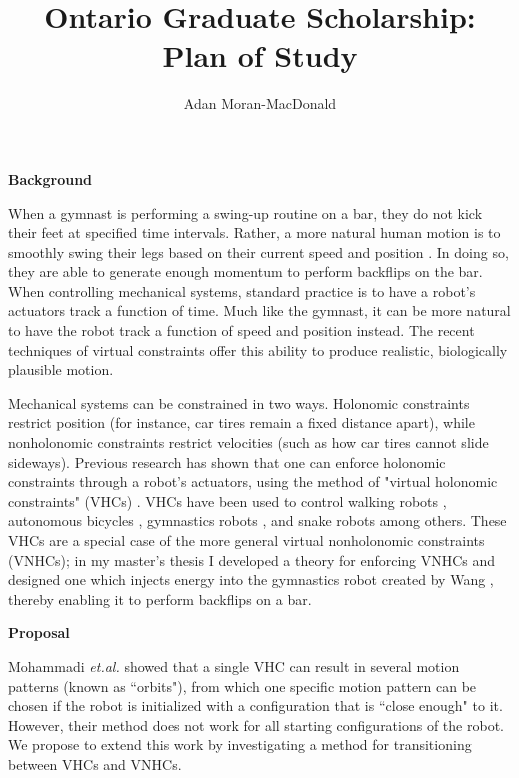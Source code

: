 \documentclass[a4paper,12pt]{article}
\begin{document}
\title{Ontario Graduate Scholarship: Plan of Study}
\author{Adan Moran-MacDonald}
\date{}
\maketitle

\begin{large}
\textbf{Background}
\end{large}

When a gymnast is performing a swing-up routine on a bar, they do not kick their
feet at specified time intervals. Rather, a more natural human motion is to
smoothly swing their legs based on their current speed and position
\cite{pendulum_length_giant_gymnastics}. In doing so, they are able to generate
enough momentum to perform backflips on the bar. When controlling mechanical
systems, standard practice is to have a robot's actuators track a function of
time. Much like the gymnast, it can be more natural to have the robot track a
function of speed and position instead. The recent techniques of virtual
constraints offer this ability to produce realistic, biologically plausible
motion.

Mechanical systems can be constrained in two ways. Holonomic constraints
restrict position (for instance, car tires remain a fixed distance apart), while
nonholonomic constraints restrict velocities (such as how car tires cannot
slide sideways). Previous research has shown that one can enforce holonomic
constraints through a robot's actuators, using the method of "virtual holonomic
constraints" (VHCs) \cite{vhcs_for_el_systems}. VHCs have been used to control
walking robots \cite{stable-walking}, autonomous bicycles \cite{bicycle},
gymnastics robots \cite{xingbo-thesis}, and snake robots \cite{snake-robot}
among others. These VHCs are a special case of the more general virtual
nonholonomic constraints (VNHCs); in my master's thesis \cite{my-thesis} I
developed a theory for enforcing VNHCs and designed one which injects energy
into the gymnastics robot created by Wang \cite{xingbo-thesis}, thereby enabling
it to perform backflips on a bar.

\begin{large} \textbf{Proposal} \end{large}

Mohammadi \textit{et.al.} \cite{manfredi-orbit-stabilization} showed that a
single VHC can result in several motion patterns (known as ``orbits"), from
which one specific motion pattern can be chosen if the robot is initialized with a
configuration that is ``close enough" to it. However, their method does not
work for all starting configurations of the robot. We propose to extend this
work by investigating a method for transitioning between VHCs and VNHCs.
\end{document}
